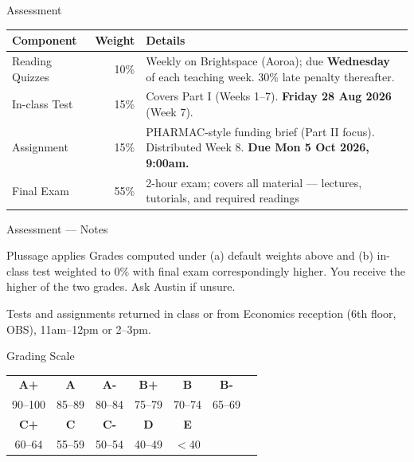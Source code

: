 \documentclass[aspectratio=169, 12pt]{beamer}
\begin{document}
\begin{frame}{Assessment}
  \begin{center}
    \begin{tabular}{@{}lrp{6.5cm}@{}}
      \toprule
      \textbf{Component} & \textbf{Weight} & \textbf{Details} \\
      \midrule
      Reading Quizzes & 10\% & Weekly on Brightspace (Aoroa); due \textbf{Wednesday} of
                               each teaching week. 30\% late penalty thereafter. \\[0.3em]
      In-class Test   & 15\% & Covers Part I (Weeks 1--7).
                               \textbf{Friday 28 Aug 2026} (Week 7). \\[0.3em]
      Assignment      & 15\% & PHARMAC-style funding brief (Part II focus).
                               Distributed Week 8.
                               \textbf{Due Mon 5 Oct 2026, 9:00am.} \\[0.3em]
      Final Exam      & 55\% & 2-hour exam; covers all material ---
                               lectures, tutorials, and required readings \\
      \bottomrule
    \end{tabular}
  \end{center}
\end{frame}

\begin{frame}{Assessment — Notes}
  \begin{alertblock}{Plussage applies}
    Grades computed under (a) default weights above and (b) in-class test weighted to 0\%
    with final exam correspondingly higher. You receive the higher of the two grades.
    Ask Austin if unsure.
  \end{alertblock}
  \vspace{0.6em}
  {\small Tests and assignments returned in class or from Economics reception
  (6th floor, OBS), 11am--12pm or 2--3pm.}
\end{frame}

\begin{frame}{Grading Scale}
  \begin{center}
    \begin{tabular}{@{}ccccccc@{}}
      \toprule
      \textbf{A+} & \textbf{A} & \textbf{A-} &
      \textbf{B+} & \textbf{B} & \textbf{B-} & \\
      90--100 & 85--89 & 80--84 & 75--79 & 70--74 & 65--69 & \\
      \midrule
      \textbf{C+} & \textbf{C} & \textbf{C-} &
      \textbf{D} & \textbf{E} & & \\
      60--64 & 55--59 & 50--54 & 40--49 & $<$40 & & \\
      \bottomrule
    \end{tabular}
  \end{center}
\end{frame}
\end{document}
